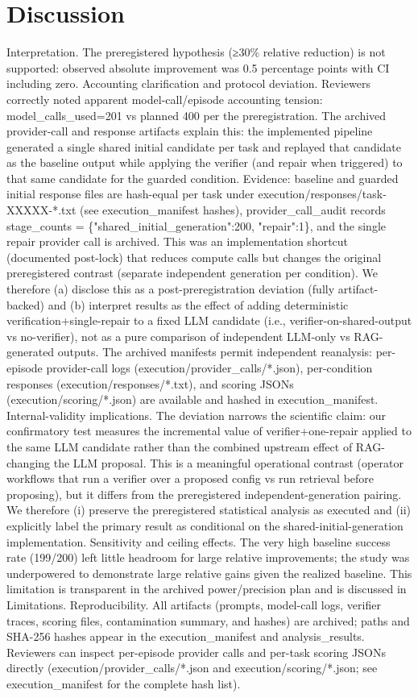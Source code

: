 \documentclass[conference]{IEEEtran}
\begin{document}
\section{Discussion}
Interpretation. The preregistered hypothesis (≥30\% relative reduction) is not supported: observed absolute improvement was 0.5 percentage points with CI including zero. Accounting clarification and protocol deviation. Reviewers correctly noted apparent model-call/episode accounting tension: model\_calls\_used=201 vs planned 400 per the preregistration. The archived provider-call and response artifacts explain this: the implemented pipeline generated a single shared initial candidate per task and replayed that candidate as the baseline output while applying the verifier (and repair when triggered) to that same candidate for the guarded condition. Evidence: baseline and guarded initial response files are hash-equal per task under execution/responses/task-XXXXX-*.txt (see execution\_manifest hashes), provider\_call\_audit records stage\_counts = \{"shared\_initial\_generation":200, "repair":1\}, and the single repair provider call is archived. This was an implementation shortcut (documented post-lock) that reduces compute calls but changes the original preregistered contrast (separate independent generation per condition). We therefore (a) disclose this as a post-preregistration deviation (fully artifact-backed) and (b) interpret results as the effect of adding deterministic verification+single-repair to a fixed LLM candidate (i.e., verifier-on-shared-output vs no-verifier), not as a pure comparison of independent LLM-only vs RAG-generated outputs. The archived manifests permit independent reanalysis: per-episode provider-call logs (execution/provider\_calls/*.json), per-condition responses (execution/responses/*.txt), and scoring JSONs (execution/scoring/*.json) are available and hashed in execution\_manifest. Internal-validity implications. The deviation narrows the scientific claim: our confirmatory test measures the incremental value of verifier+one-repair applied to the same LLM candidate rather than the combined upstream effect of RAG-changing the LLM proposal. This is a meaningful operational contrast (operator workflows that run a verifier over a proposed config vs run retrieval before proposing), but it differs from the preregistered independent-generation pairing. We therefore (i) preserve the preregistered statistical analysis as executed and (ii) explicitly label the primary result as conditional on the shared-initial-generation implementation. Sensitivity and ceiling effects. The very high baseline success rate (199/200) left little headroom for large relative improvements; the study was underpowered to demonstrate large relative gains given the realized baseline. This limitation is transparent in the archived power/precision plan and is discussed in Limitations. Reproducibility. All artifacts (prompts, model-call logs, verifier traces, scoring files, contamination summary, and hashes) are archived; paths and SHA-256 hashes appear in the execution\_manifest and analysis\_results. Reviewers can inspect per-episode provider calls and per-task scoring JSONs directly (execution/provider\_calls/*.json and execution/scoring/*.json; see execution\_manifest for the complete hash list).
\end{document}
